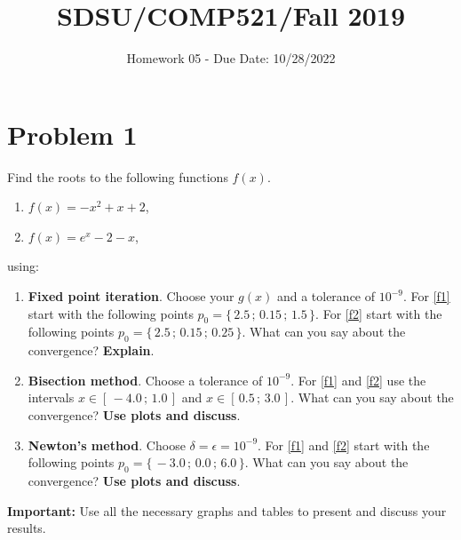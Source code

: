\documentclass{article}
\title{SDSU/COMP521/Fall 2019}
\author{Homework 05 - Due Date: 10/28/2022}
\begin{document}
\newcommand{\norm}[1]{\left\lVert#1\right\rVert}
\maketitle

\section*{Problem 1}
Find the roots to the following functions $f(x)$.
\begin{enumerate}[label=(\alph*)]
	\item \label{f1} $f(x) = -x^2 +x + 2$,
	\item \label{f2} $f(x) = e^x -2 - x$,	
\end{enumerate}

using:

\begin{enumerate}
	\item \textbf{Fixed point iteration}. Choose your $g(x)$ and a tolerance of $10^{-9}$. For \ref{f1} start with the following points $p_0 =\{\,2.5\,;\,0.15\,;\,1.5\,\}$. For \ref{f2} start with the following points $p_0 =\{\,2.5\,; \,0.15\,;\, 0.25\,\}$. What can you say about the convergence? \textbf{Explain}.
	\item \textbf{Bisection method}. Choose a tolerance of $10^{-9}$. For \ref{f1} and \ref{f2} use the intervals $x \in [\,-4.0\,;\,1.0\,]$ and $x \in [\,0.5\,;\,3.0\,]$. What can you say about the convergence? \textbf{Use plots and discuss}.
	\item \textbf{Newton's method}. Choose $\delta=\epsilon=10^{-9}$. For \ref{f1} and \ref{f2} start with the following points $p_0 =\{\,-3.0\,;\,0.0\,;\,6.0\,\}$. What can you say about the convergence? \textbf{Use plots and discuss}.
		
	
\end{enumerate}

\textbf{Important:} Use all the necessary graphs and tables to present and discuss your results.
\end{document}
